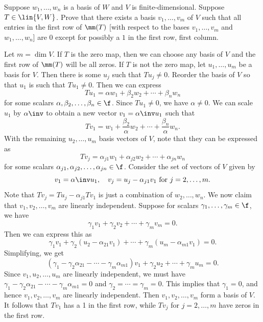 \begin{exercise}[3c7]
    Suppose $w_1, \ldots, w_n$ is a basis of $W$ and $V$ is finite-dimensional. Suppose $T \in \lin{V, W}$. Prove that there exists a basis $v_1, \ldots, v_m$ of $V$ such that all entries in the first row of $\mm(T)$ [with respect to the bases $v_1, \ldots, v_m$ and $w_1, \ldots, w_n$] are $0$ except for possibly a $1$ in the first row, first column.
\end{exercise}

\begin{sol}
    Let $m = \dim V$. If $T$ is the zero map, then we can choose any basis of $V$ and the first row of $\mm(T)$ will be all zeros. If $T$ is not the zero map, let $u_1, \ldots, u_m$ be a basis for $V$. Then there is some $u_j$ such that $Tu_j \neq 0$. Reorder the basis of $V$ so that $u_1$ is such that $Tu_1 \neq 0$. Then we can express
    \[Tu_1 = \alpha w_1 + \beta_2 w_2 + \cdots + \beta_n w_n\]
    for some scalars $\alpha, \beta_2, \ldots, \beta_n \in \f$. Since $Tu_1 \neq 0$, we have $\alpha \neq 0$. We can scale $u_1$ by $\alpha\inv$ to obtain a new vector $v_1 = \alpha\inv u_1$ such that
    \[Tv_1 = w_1 + \frac{\beta_2}{\alpha} w_2 + \cdots + \frac{\beta_n}{\alpha} w_n.\]
    With the remaining $u_2, \ldots, u_m$ basis vectors of $V$, note that they can be expressed as
    \[Tv_j = \alpha_{j1} w_1 + \alpha_{j2} w_2 + \cdots + \alpha_{jn} w_n\]
    for some scalars $\alpha_{j1}, \alpha_{j2}, \ldots, \alpha_{jn} \in \f$. Consider the set of vectors of $V$ given by
    \[v_1 = \alpha\inv u_1, \quad v_j = u_j - \alpha_{j1} v_1 \text{ for } j = 2, \ldots, m.\]
    Note that $Tv_j = Tu_j - \alpha_{j1} Tv_1$ is just a combination of $w_2, \ldots, w_n$. We now claim that $v_1, v_2, \ldots, v_m$ are linearly independent. Suppose for scalars $\gamma_1, \ldots, \gamma_m \in \f$, we have
    \[\gamma_1 v_1 + \gamma_2 v_2 + \cdots + \gamma_m v_m = 0.\]
    Then we can express this as
    \[\gamma_1 v_1 + \gamma_2 (u_2 - \alpha_{21} v_1) + \cdots + \gamma_m (u_m - \alpha_{m1} v_1) = 0.\]
    Simplifying, we get
    \[(\gamma_1 - \gamma_2 \alpha_{21} - \cdots - \gamma_m \alpha_{m1}) v_1 + \gamma_2 u_2 + \cdots + \gamma_m u_m = 0.\]
    Since $v_1, u_2, \ldots, u_m$ are linearly independent, we must have $\gamma_1 - \gamma_2 \alpha_{21} - \cdots - \gamma_m \alpha_{m1} = 0$ and $\gamma_2 = \cdots = \gamma_m = 0$. This implies that $\gamma_1 = 0$, and hence $v_1, v_2, \ldots, v_m$ are linearly independent. Then $v_1, v_2, \ldots, v_m$ form a basis of $V$. It follows that $Tv_1$ has a 1 in the first row, while $Tv_j$ for $j = 2, \ldots, m$ have zeros in the first row.
\end{sol}

